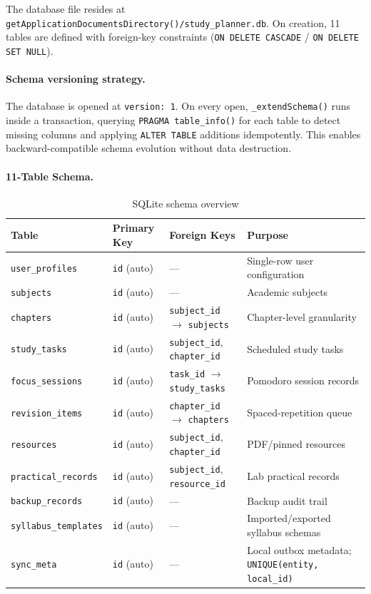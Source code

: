 \documentclass[12pt,a4paper,openany]{report}
\begin{document}
The database file resides at \texttt{getApplicationDocumentsDirectory()/study\_planner.db}. On creation, 11 tables are defined with foreign-key constraints (\texttt{ON DELETE CASCADE} / \texttt{ON DELETE SET NULL}).

\paragraph{Schema versioning strategy.}
The database is opened at \texttt{version: 1}. On every open, \texttt{\_extendSchema()} runs inside a transaction, querying \texttt{PRAGMA table\_info()} for each table to detect missing columns and applying \texttt{ALTER TABLE} additions idempotently. This enables backward-compatible schema evolution without data destruction.

\paragraph{11-Table Schema.}

\begin{table}[H]
\centering
\caption{SQLite schema overview}
\label{tab:schema}
\small
\begin{tabular}{llll}
\toprule
\textbf{Table} & \textbf{Primary Key} & \textbf{Foreign Keys} & \textbf{Purpose} \\
\midrule
\texttt{user\_profiles} & \texttt{id} (auto) & --- & Single-row user configuration \\
\texttt{subjects} & \texttt{id} (auto) & --- & Academic subjects \\
\texttt{chapters} & \texttt{id} (auto) & \texttt{subject\_id} $\to$ \texttt{subjects} & Chapter-level granularity \\
\texttt{study\_tasks} & \texttt{id} (auto) & \texttt{subject\_id}, \texttt{chapter\_id} & Scheduled study tasks \\
\texttt{focus\_sessions} & \texttt{id} (auto) & \texttt{task\_id} $\to$ \texttt{study\_tasks} & Pomodoro session records \\
\texttt{revision\_items} & \texttt{id} (auto) & \texttt{chapter\_id} $\to$ \texttt{chapters} & Spaced-repetition queue \\
\texttt{resources} & \texttt{id} (auto) & \texttt{subject\_id}, \texttt{chapter\_id} & PDF/pinned resources \\
\texttt{practical\_records} & \texttt{id} (auto) & \texttt{subject\_id}, \texttt{resource\_id} & Lab practical records \\
\texttt{backup\_records} & \texttt{id} (auto) & --- & Backup audit trail \\
\texttt{syllabus\_templates} & \texttt{id} (auto) & --- & Imported/exported syllabus schemas \\
\texttt{sync\_meta} & \texttt{id} (auto) & --- & Local outbox metadata; \texttt{UNIQUE(entity, local\_id)} \\
\bottomrule
\end{tabular}
\end{table}
\end{document}
